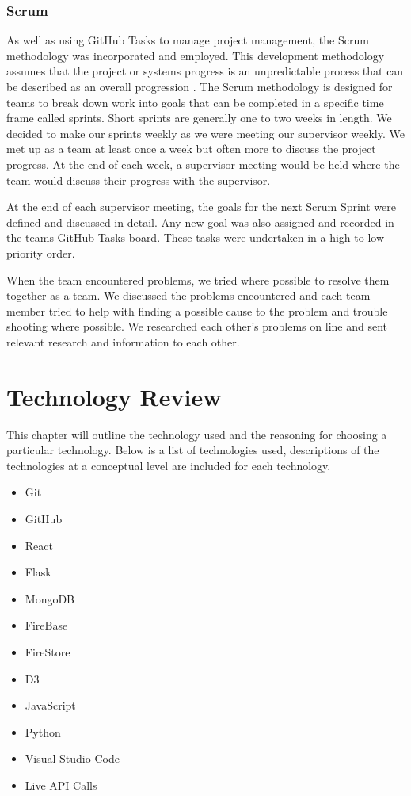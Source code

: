 \subsection{Scrum}
As well as using GitHub Tasks to manage project management, the Scrum methodology was incorporated and employed. This development methodology assumes that the project or systems progress is an unpredictable process that can be described as an overall progression \cite{schwaber1997scrum}. The Scrum methodology is designed for teams to break down work into goals that can be completed in a specific time frame called sprints. Short sprints are generally one to two weeks in length. We decided to make our sprints weekly as we were meeting our supervisor weekly. We met up as a team at least once a week but often more to discuss the project progress.
At the end of each week, a supervisor meeting would be held where the team would discuss their progress with the supervisor.

\vspace{5mm} %

At the end of each supervisor meeting, the goals for the next Scrum Sprint were defined and discussed in detail. Any new goal was also assigned and recorded in the teams GitHub Tasks board. These tasks were undertaken in a high to low priority order.

\vspace{5mm}
When the team encountered problems, we tried where possible to resolve them together as a team. We discussed the problems encountered and each team member tried to help with finding a possible cause to the problem and trouble shooting where possible. We researched each other's problems on line and sent relevant research and information to each other.

\vspace{5mm} %


\chapter{Technology Review}
This chapter will outline the technology used and the reasoning for choosing a particular technology. Below is a list of technologies used, descriptions of the technologies at a conceptual level are included for each technology.
\begin{itemize}
\item Git
\item GitHub
\item React
\item Flask
\item MongoDB
\item FireBase
\item FireStore
\item D3
\item JavaScript
\item Python
\item Visual Studio Code
\item Live API Calls

\end{itemize}

